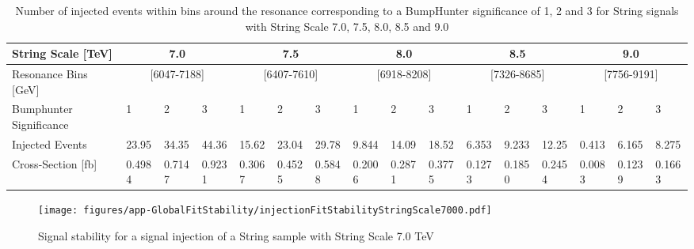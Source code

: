 \begin{table}[]
    \tiny
    \begin{center}
        \begin{tabular}{l|lll|lll|lll|lll|lll|}
            \toprule
            \midrule
            String Scale {[}TeV{]}   & \multicolumn{3}{c|}{7.0}             & \multicolumn{3}{c|}{7.5}             &
\multicolumn{3}{c|}{8.0}             & \multicolumn{3}{c|}{8.5}             & \multicolumn{3}{c|}{9.0}             \\
            \midrule
            Resonance Bins {[}GeV{]} & \multicolumn{3}{c|}{{[}6047-7188{]}} & \multicolumn{3}{c|}{{[}6407-7610{]}} & \multicolumn{3}{c|}{{[}6918-8208{]}} & \multicolumn{3}{c|}{{[}7326-8685{]}} & \multicolumn{3}{c|}{{[}7756-9191{]}} \\
            Bumphunter Significance  & 1          & 2          & 3          & 1          & 2          & 3          & 1          & 2          & 3          & 1          & 2          & 3          & 1          & 2          & 3          \\
            Injected Events          & 23.95      & 34.35      & 44.36      & 15.62      & 23.04      & 29.78      & 9.844      & 14.09      & 18.52      & 6.353      & 9.233      & 12.25      & 0.413      & 6.165      & 8.275      \\
            Cross-Section {[}fb{]}   & 0.4984     & 0.7147     & 0.9231     & 0.3067     & 0.4525     & 0.5848     & 0.2006     & 0.2871     & 0.3775     & 0.1273     & 0.1850     & 0.2454     & 0.0083     & 0.1239     & 0.1663 \\
            \midrule
            \bottomrule
            \end{tabular}
        \end{center}
    \caption{Number of injected events within bins around the resonance corresponding to a BumpHunter significance of 1, 2 and 3 for String signals with String Scale 7.0, 7.5, 8.0, 8.5 and 9.0}
    \label{tab:BHSignifcanceStringInjection}
\end{table}
\begin{figure}
    \centering
    \texttt{[image: figures/app-GlobalFitStability/injectionFitStabilityStringScale7000.pdf]}
    \caption{Signal stability for a signal injection of a String sample with String Scale 7.0 TeV}
    \label{fig:StringSignalInjectionFitStabilityStudyMs7.0TeV}
\end{figure}
